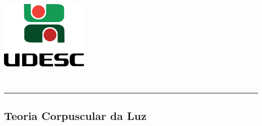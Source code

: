 \thispagestyle{empty}
\begin{center}
	\begin{minipage}[!]{\linewidth}
        \begin{minipage}[!]{.19\linewidth}
            \includegraphics[width=\linewidth]{img/logo.png}           
        \end{minipage}
        \begin{minipage}[!]{.8\linewidth}
            \center
            \ABNTEXchapterfont\normalsize\MakeUppercase{\imprimirinstituicao}
            \par
            \vspace*{10pt}                     
            \ABNTEXchapterfont\normalsize\MakeUppercase{\centro}
            \par
            \vspace*{10pt}           
            \ABNTEXchapterfont\normalsize\MakeUppercase{\disciplina}
        \end{minipage}        
    \end{minipage}
    \\ \vspace{0.5cm}
    \rule{\textwidth}{.5pt}   
\end{center}
    \textual
    \begin{center}
      \section{Teoria Corpuscular da Luz}
      \par
    \end{center}
    
